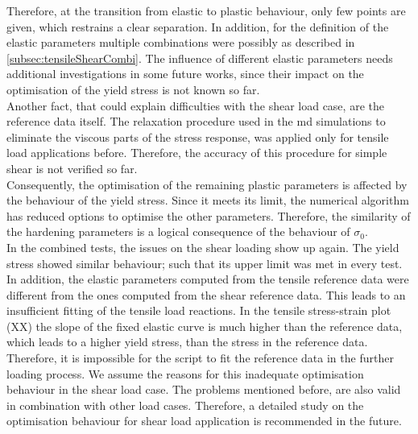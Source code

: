 Therefore, at the transition from elastic to plastic behaviour, only few points are given, which restrains a clear separation. In addition, for the definition of the elastic parameters multiple combinations were possibly as described in \autoref{subsec:tensileShearCombi}. The influence of different elastic parameters needs additional investigations in some future works, since their impact on the optimisation of the yield stress is not known so far. \\
\indent Another fact, that could explain difficulties with the shear load case, are the reference data itself. The relaxation procedure used in the \acrshort{md} simulations to eliminate the viscous parts of the stress response, was applied only for tensile load applications before. Therefore, the accuracy of this procedure for simple shear is not verified so far. \\
\indent Consequently, the optimisation of the remaining plastic parameters is affected by the behaviour of the yield stress. Since it meets its limit, the numerical algorithm has reduced options to optimise the other parameters. Therefore, the similarity of the hardening parameters is a logical consequence of the behaviour of $\sigma_0$. \\
\indent In the combined tests, the issues on the shear loading show up again. The yield stress showed similar behaviour; such that its upper limit was met in every test.
In addition, the elastic parameters computed from the tensile reference data were different from the ones computed from the shear reference data.
This leads to an insufficient fitting of the tensile load reactions. In the tensile stress-strain plot (XX) the slope of the fixed elastic curve is much higher than the reference data, which leads to a higher yield stress, than the stress in the reference data. Therefore, it is impossible for the script to fit the reference data in the further loading process. We assume the reasons for this inadequate optimisation behaviour in the shear load case. The problems mentioned before, are also valid in combination with other load cases. Therefore, a detailed study on the optimisation behaviour for shear load application is recommended in the future.

 




